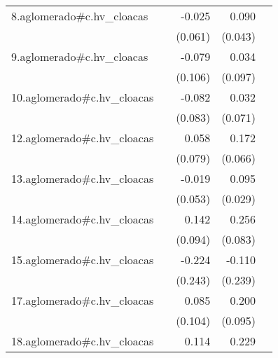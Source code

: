 {\begin{longtable}{l*{4}{D{.}{.}{-1}}}
\addlinespace
8.aglomerado#c.hv\_cloacas&                     &      -0.025         &       0.090\sym{*}  &                     \\
            &                     &     (0.061)         &     (0.043)         &                     \\
\addlinespace
9.aglomerado#c.hv\_cloacas&                     &      -0.079         &       0.034         &                     \\
            &                     &     (0.106)         &     (0.097)         &                     \\
\addlinespace
10.aglomerado#c.hv\_cloacas&                     &      -0.082         &       0.032         &                     \\
            &                     &     (0.083)         &     (0.071)         &                     \\
\addlinespace
12.aglomerado#c.hv\_cloacas&                     &       0.058         &       0.172\sym{**} &                     \\
            &                     &     (0.079)         &     (0.066)         &                     \\
\addlinespace
13.aglomerado#c.hv\_cloacas&                     &      -0.019         &       0.095\sym{**} &                     \\
            &                     &     (0.053)         &     (0.029)         &                     \\
\addlinespace
14.aglomerado#c.hv\_cloacas&                     &       0.142         &       0.256\sym{**} &                     \\
            &                     &     (0.094)         &     (0.083)         &                     \\
\addlinespace
15.aglomerado#c.hv\_cloacas&                     &      -0.224         &      -0.110         &                     \\
            &                     &     (0.243)         &     (0.239)         &                     \\
\addlinespace
17.aglomerado#c.hv\_cloacas&                     &       0.085         &       0.200\sym{*}  &                     \\
            &                     &     (0.104)         &     (0.095)         &                     \\
\addlinespace
18.aglomerado#c.hv\_cloacas&                     &       0.114         &       0.229\sym{***}&                     \\

\end{longtable}}
